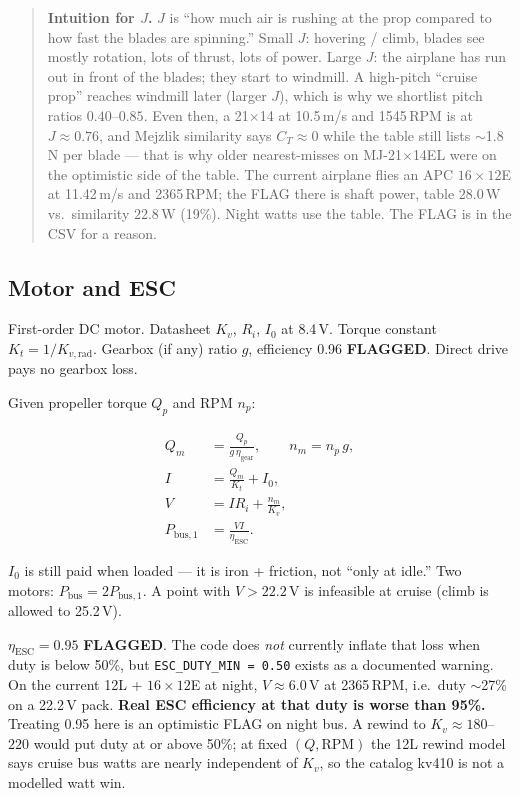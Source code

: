 \documentclass[11pt,letterpaper]{article}
\newcommand{\flag}{\textcolor{red!60!black}{\textbf{FLAGGED}}}
\newcommand{\code}[1]{\texttt{#1}}
\newenvironment{intuition}{\begin{quote}\small}{\end{quote}}
\begin{document}
\begin{intuition}
\textbf{Intuition for $J$.} $J$ is ``how much air is rushing at the prop compared to how fast the blades are spinning.'' Small $J$: hovering / climb, blades see mostly rotation, lots of thrust, lots of power. Large $J$: the airplane has run out in front of the blades; they start to windmill. A high-pitch ``cruise prop'' reaches windmill later (larger $J$), which is why we shortlist pitch ratios $0.40$--$0.85$. Even then, a 21$\times$14 at 10.5\,m/s and 1545\,RPM is at $J \approx 0.76$, and Mejzlik similarity says $C_T \approx 0$ while the table still lists $\sim$1.8\,N per blade --- that is why older nearest-misses on MJ-21$\times$14EL were on the optimistic side of the table. The current airplane flies an APC $16\times12$E at 11.42\,m/s and 2365\,RPM; the FLAG there is shaft power, table $28.0\,\mathrm{W}$ vs.\ similarity $22.8\,\mathrm{W}$ (19\%). Night watts use the table. The FLAG is in the CSV for a reason.
\end{intuition}

\subsection{Motor and ESC}

First-order DC motor. Datasheet $K_v$, $R_i$, $I_0$ at 8.4\,V. Torque constant $K_t = 1 / K_{v,\mathrm{rad}}$. Gearbox (if any) ratio $g$, efficiency 0.96 \flag{}. Direct drive pays no gearbox loss.

Given propeller torque $Q_p$ and RPM $n_p$:

\begin{align}
  Q_m &= \frac{Q_p}{g\,\eta_\mathrm{gear}}, \qquad
  n_m = n_p\, g, \\
  I &= \frac{Q_m}{K_t} + I_0, \\
  V &= I R_i + \frac{n_m}{K_v}, \\
  P_\mathrm{bus,1} &= \frac{V I}{\eta_\mathrm{ESC}}.
\end{align}

$I_0$ is still paid when loaded --- it is iron + friction, not ``only at idle.'' Two motors: $P_\mathrm{bus} = 2 P_\mathrm{bus,1}$. A point with $V > 22.2\,\mathrm{V}$ is infeasible at cruise (climb is allowed to 25.2\,V).

$\eta_\mathrm{ESC} = 0.95$ \flag{}. The code does \emph{not} currently inflate that loss when duty is below 50\%, but \code{ESC\_DUTY\_MIN = 0.50} exists as a documented warning. On the current 12L + $16\times12$E at night, $V \approx 6.0\,\mathrm{V}$ at 2365\,RPM, i.e.\ duty $\sim$27\% on a 22.2\,V pack. \textbf{Real ESC efficiency at that duty is worse than 95\%.} Treating 0.95 here is an optimistic FLAG on night bus. A rewind to $K_v \approx 180$--$220$ would put duty at or above 50\%; at fixed $(Q,\mathrm{RPM})$ the 12L rewind model says cruise bus watts are nearly independent of $K_v$, so the catalog kv410 is not a modelled watt win.
\end{document}
